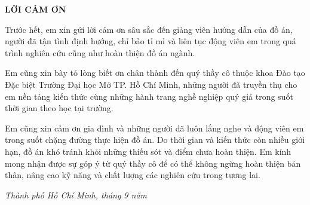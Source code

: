 \thispagestyle{empty}

\begin{center}
    {\Large \bfseries LỜI CẢM ƠN \par}
\end{center}

\vspace{1.5em}

\hspace{10pt} Trước hết, em xin gửi lời cảm ơn sâu sắc đến \textbf{\supervisor} giảng viên hướng dẫn của đồ án, người đã tận tình định hướng, chỉ bảo tỉ mỉ và liên tục động viên em trong quá trình nghiên cứu cũng như hoàn thiện đồ án ngành.

\hspace{10pt} Em cũng xin bày tỏ lòng biết ơn chân thành đến quý thầy cô thuộc khoa Đào tạo Đặc biệt Trường Đại học Mở TP. Hồ Chí Minh, những người đã truyền thụ cho em nền tảng kiến thức cùng những hành trang nghề nghiệp quý giá trong suốt thời gian theo học tại trường.

\hspace{10pt} Em cũng xin cảm ơn gia đình và những người đã luôn lắng nghe và động viên em trong suốt chặng đường thực hiện đồ án. Do thời gian và kiến thức còn nhiều giới hạn, đồ án khó tránh khỏi những thiếu sót và điểm chưa hoàn thiện. Em kính mong nhận được sự góp ý từ quý thầy cô để có thể không ngừng hoàn thiện bản thân, nâng cao kỹ năng và chất lượng các nghiên cứu trong tương lai.

\vspace{2em}

\begin{flushright}
    \emph{Thành phố Hồ Chí Minh, tháng 9 năm \currentyear}\\
    \\
    \textbf{\studentname}
\end{flushright}
